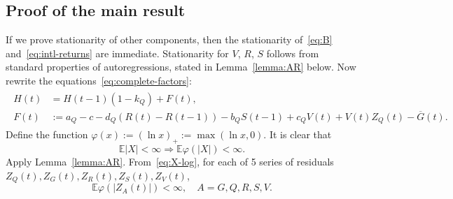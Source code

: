 \documentclass[12pt]{amsart}
\begin{document}
\subsection{Proof of the main result} If we prove stationarity of other components, then the stationarity of~\eqref{eq:B} and~\eqref{eq:intl-returns} are immediate. Stationarity for $V$, $R$, $S$ follows from standard properties of autoregressions, stated in Lemma~\ref{lemma:AR} below. Now rewrite the equations~\eqref{eq:complete-factors}:
\begin{align}
\begin{split}
H(t) &= H(t-1)(1 - k_Q) + F(t),\\
F(t) &:= a_Q - c - d_Q(R(t) - R(t-1)) - b_QS(t-1) + c_QV(t) + V(t)Z_Q(t) - \overline{G}(t).
\end{split}
\end{align}
Define the function $\varphi(x) := (\ln x)_+ := \max(\ln x, 0)$. It is clear that 
\begin{equation}
\label{eq:X-log}
\mathbb E|X| < \infty \Rightarrow \mathbb E\varphi(|X|) < \infty. 
\end{equation}
Apply Lemma~\ref{lemma:AR}. From~\eqref{eq:X-log}, for each of 5 series of residuals $Z_Q(t), Z_G(t), Z_R(t), Z_S(t), Z_V(t)$, 
\begin{equation}
\label{eq:log-residuals}
\mathbb E\varphi(|Z_A(t)|) < \infty,\quad A = G, Q, R, S, V.
\end{equation}
\end{document}
